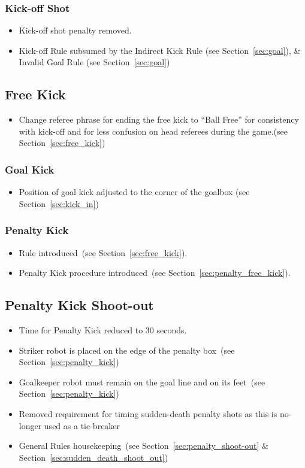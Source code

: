 \documentclass[12pt]{article}
\newcommand{\cf}{see\xspace}
\newcommand{\PenaltyKickTime}{30 seconds\xspace}
\begin{document}
\subsubsection*{Kick-off Shot}
\begin{itemize}
  \item Kick-off shot penalty removed.
  \item Kick-off Rule subsumed by the Indirect Kick Rule (\cf Section~\ref{sec:goal}), \& Invalid Goal Rule (\cf Section~\ref{sec:goal})
\end{itemize}

\subsection*{Free Kick}
\begin{itemize}
  \item Change referee phrase for ending the free kick to ``Ball Free'' for consistency with kick-off and for less confusion on  head referees during the game.(\cf Section~\ref{sec:free_kick})
\end{itemize}

\subsubsection*{Goal Kick}
\begin{itemize}
  \item Position of goal kick adjusted to the corner of the goalbox (\cf Section~\ref{sec:kick_in})
\end{itemize}

\subsubsection*{Penalty Kick}
\begin{itemize}
  \item Rule introduced~(\cf Section~\ref{sec:free_kick}).
  \item Penalty Kick procedure introduced~(\cf Section~\ref{sec:penalty_free_kick}).
\end{itemize}

\subsection*{Penalty Kick Shoot-out}
\begin{itemize}
  \item Time for Penalty Kick reduced to \PenaltyKickTime.
  \item Striker robot is placed on the edge of the penalty box~(\cf Section~\ref{sec:penalty_kick})
  \item Goalkeeper robot must remain on the goal line and on its feet~(\cf Section~\ref{sec:penalty_kick})
  \item Removed requirement for timing sudden-death penalty shots as this is no-longer used as a tie-breaker
  \item General Rules housekeeping~(\cf Section~\ref{sec:penalty_shoot-out} \& Section~\ref{sec:sudden_death_shoot_out})
\end{itemize}
\end{document}
